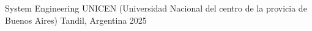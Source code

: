 \begin{cventries}
\cventry
{System Engineering} %
{UNICEN (Universidad Nacional del centro de la provicia de Buenos Aires)} %
{Tandil, Argentina} %
{2025} %
{ %
}
\end{cventries}
